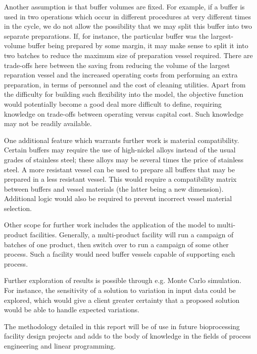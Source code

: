 Another assumption is that buffer volumes are fixed.
For example, if a buffer is used in two operations which occur in different
procedures at very different times in the cycle, we do not allow the
possibility that we may split this buffer into two separate preparations.
If, for instance, the particular buffer was the largest-volume buffer being
prepared by some margin, it may make sense to split it into two batches to
reduce the maximum size of preparation vessel required.
There are trade-offs here between the saving from reducing the volume of the
largest reparation vessel and the increased operating costs from performing an
extra preparation, in terms of personnel and the cost of cleaning utilities.
Apart from the difficulty for building such flexibility into the model, the
objective function would potentially become a good deal more difficult to
define, requiring knowledge on trade-offs between operating versus capital
cost. Such knowledge may not be readily available.

One additional feature which warrants further work is material compatibility.
Certain buffers may require the use of high-nickel alloys instead of the
usual grades of stainless steel; these alloys may be several times the price
of stainless steel.
A more resistant vessel can be used to prepare all buffers that may be prepared
in a less resistant vessel.
This would require a compatibility matrix between buffers and vessel materials
(the latter being a new dimension).
Additional logic would also be required to prevent incorrect vessel material
selection.

Other scope for further work includes the application of the model to
multi-product facilities.
Generally, a multi-product facility will run a campaign of batches of one
product, then switch over to run a campaign of some other process.
Such a facility would need buffer vessels capable of supporting each process.

Further exploration of results is possible through e.g. Monte Carlo simulation.
For instance, the sensitivity of a solution to variation in input data could
be explored, which would give a client greater certainty that a proposed
solution would be able to handle expected variations.

The methodology detailed in this report will be of use in future bioprocessing
facility design projects and adds to the body of knowledge in the fields of
process engineering and linear programming.
